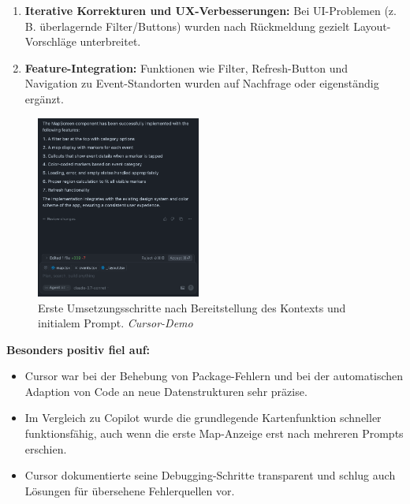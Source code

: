 \begin{enumerate}[resume]
      \item \textbf{Iterative Korrekturen und UX-Verbesserungen:} Bei UI-Problemen (z.\,B. überlagernde Filter/Buttons) wurden nach Rückmeldung gezielt Layout-Vorschläge unterbreitet.
      \item \textbf{Feature-Integration:} Funktionen wie Filter, Refresh-Button und Navigation zu Event-Standorten wurden auf Nachfrage oder eigenständig ergänzt.
\end{enumerate}

\begin{figure}[htbp]
      \centering
      \vspace{1em}
      \includegraphics[width=0.48\textwidth]{images/cursor_screenshots/erster durchgang-cursor.png}
      \caption{Erste Umsetzungsschritte nach Bereitstellung des Kontexts und initialem Prompt. \textit{Cursor-Demo}}
      \label{fig:cursor-erster-durchgang}
\end{figure}

\textbf{Besonders positiv fiel auf:}
\begin{itemize}
      \item Cursor war bei der Behebung von Package-Fehlern und bei der automatischen
            Adaption von Code an neue Datenstrukturen sehr präzise.
      \item Im Vergleich zu Copilot wurde die grundlegende Kartenfunktion schneller
            funktionsfähig, auch wenn die erste Map-Anzeige erst nach mehreren Prompts
            erschien.
      \item Cursor dokumentierte seine Debugging-Schritte transparent und schlug auch
            Lösungen für übersehene Fehlerquellen vor.
\end{itemize}

